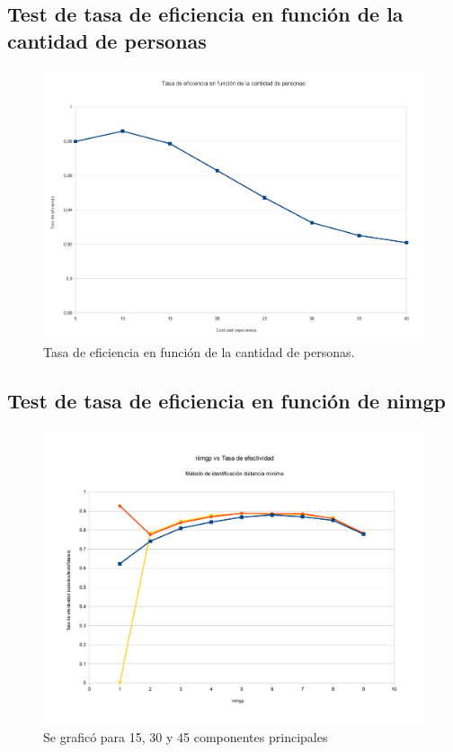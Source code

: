 \subsection{Test de tasa de eficiencia en función de la cantidad de personas}
\begin{figure}[H]{}
\centering
\includegraphics[scale=0.5]{graphs/CPvsTE.pdf}
\caption{Tasa de eficiencia en función de la cantidad de personas.}
\label{CPvsTE}
\end{figure}

\subsection{Test de tasa de eficiencia en función de nimgp}
\begin{figure}[H]{}
\centering
\includegraphics[scale=0.5]{graphs/nimgpVsTasaDeEfectividad.pdf}
\caption{Se graficó para 15, 30 y 45 componentes principales}
\label{nimgpvsTE}
\end{figure}

